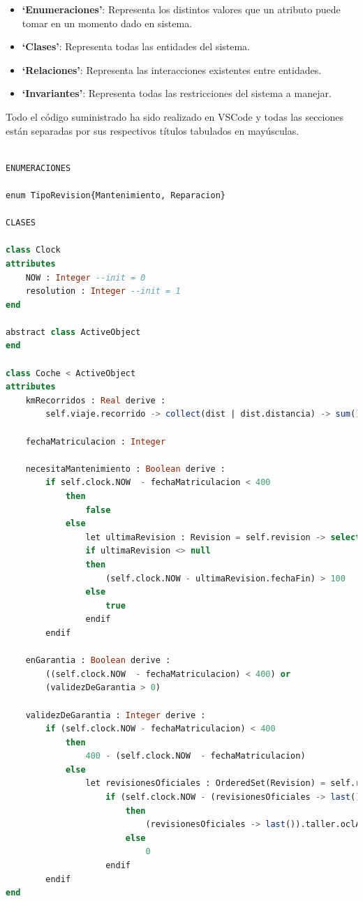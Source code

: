 \documentclass[12pt.a4paper]{article}
\begin{document}
\begin{itemize}
    \item \textbf{‘Enumeraciones’}: Representa los distintos valores que un atributo puede tomar en un momento dado en sistema.
    \item \textbf{‘Clases’}: Representa todas las entidades del sistema.
    \item \textbf{‘Relaciones’}: Representa las interacciones existentes entre entidades.
    \item \textbf{‘Invariantes’}: Representa todas las restricciones del sistema a manejar.
\end{itemize}
Todo el código suministrado ha sido realizado en VSCode y
todas las secciones están separadas por sus respectivos títulos tabulados en mayúsculas.
\vspace{3cm}
\begin{lstlisting}[style = useNormal,language=SQL, caption={Modelo de Sistema de Coches en USE}] 

ENUMERACIONES

enum TipoRevision{Mantenimiento, Reparacion}

CLASES 

class Clock
attributes
    NOW : Integer --init = 0            
    resolution : Integer --init = 1
end

abstract class ActiveObject
end

class Coche < ActiveObject
attributes
    kmRecorridos : Real derive :        
        self.viaje.recorrido -> collect(dist | dist.distancia) -> sum()
        
    fechaMatriculacion : Integer            

    necesitaMantenimiento : Boolean derive : 
        if self.clock.NOW  - fechaMatriculacion < 400 
            then
                false
            else
                let ultimaRevision : Revision = self.revision -> select(rev | rev.tipo = TipoRevision::Mantenimiento) -> sortedBy(r | r.fechaInicio) -> last() in
                if ultimaRevision <> null
                then
                    (self.clock.NOW - ultimaRevision.fechaFin) > 100
                else
                    true
                endif
        endif

    enGarantia : Boolean derive :             
        ((self.clock.NOW  - fechaMatriculacion) < 400) or
        (validezDeGarantia > 0)

    validezDeGarantia : Integer derive :   
        if (self.clock.NOW - fechaMatriculacion) < 400 
            then 
                400 - (self.clock.NOW  - fechaMatriculacion) 
            else
                let revisionesOficiales : OrderedSet(Revision) = self.revision -> select(rev | rev.taller.oclIsKindOf(Oficial)) -> sortedBy(rev | rev.fechaInicio) in
                    if (self.clock.NOW - (revisionesOficiales -> last()).fechaFin) < (revisionesOficiales -> last()).taller.oclAsType(Oficial).garantia
                        then
                            (revisionesOficiales -> last()).taller.oclAsType(Oficial).garantia - (self.clock.NOW - (revisionesOficiales -> last()).fechaFin)
                        else 
                            0
                    endif          
        endif 
end 


\end{lstlisting}
\end{document}
